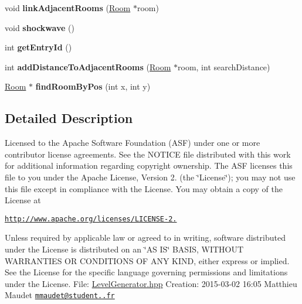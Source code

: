 \begin{DoxyCompactItemize}
\item 
\hypertarget{class_level_generator_aaaccd1f1c3b4331d30ba5a56b3d027f8}{void {\bfseries link\+Adjacent\+Rooms} (\hyperlink{class_room}{Room} $\ast$room)}\label{class_level_generator_aaaccd1f1c3b4331d30ba5a56b3d027f8}

\item 
\hypertarget{class_level_generator_afaa688bd1e11103c8afb45dbfa41c0c7}{void {\bfseries shockwave} ()}\label{class_level_generator_afaa688bd1e11103c8afb45dbfa41c0c7}

\item 
\hypertarget{class_level_generator_ab9f4dd15ee1d8f0659d3df0956d087af}{int {\bfseries get\+Entry\+Id} ()}\label{class_level_generator_ab9f4dd15ee1d8f0659d3df0956d087af}

\item 
\hypertarget{class_level_generator_af8a3c3f49855932e09da03107205c72f}{int {\bfseries add\+Distance\+To\+Adjacent\+Rooms} (\hyperlink{class_room}{Room} $\ast$room, int search\+Distance)}\label{class_level_generator_af8a3c3f49855932e09da03107205c72f}

\item 
\hypertarget{class_level_generator_a6af493402fdf30516ea0c122d2c82a4b}{\hyperlink{class_room}{Room} $\ast$ {\bfseries find\+Room\+By\+Pos} (int x, int y)}\label{class_level_generator_a6af493402fdf30516ea0c122d2c82a4b}

\end{DoxyCompactItemize}


\subsection{Detailed Description}
Licensed to the Apache Software Foundation (A\+S\+F) under one or more contributor license agreements. See the N\+O\+T\+I\+C\+E file distributed with this work for additional information regarding copyright ownership. The A\+S\+F licenses this file to you under the Apache License, Version 2. (the \char`\"{}\+License\char`\"{}); you may not use this file except in compliance with the License. You may obtain a copy of the License at

\href{http://www.apache.org/licenses/LICENSE-2.0}{\tt http\+://www.\+apache.\+org/licenses/\+L\+I\+C\+E\+N\+S\+E-\/2.}

Unless required by applicable law or agreed to in writing, software distributed under the License is distributed on an \char`\"{}\+A\+S I\+S\char`\"{} B\+A\+S\+I\+S, W\+I\+T\+H\+O\+U\+T W\+A\+R\+R\+A\+N\+T\+I\+E\+S O\+R C\+O\+N\+D\+I\+T\+I\+O\+N\+S O\+F A\+N\+Y K\+I\+N\+D, either express or implied. See the License for the specific language governing permissions and limitations under the License. File\+: \hyperlink{_level_generator_8hpp_source}{Level\+Generator.\+hpp} Creation\+: 2015-\/03-\/02 16\+:05 Matthieu Maudet \href{mailto:mmaudet@student.42.fr}{\tt mmaudet@student..\+fr} 

